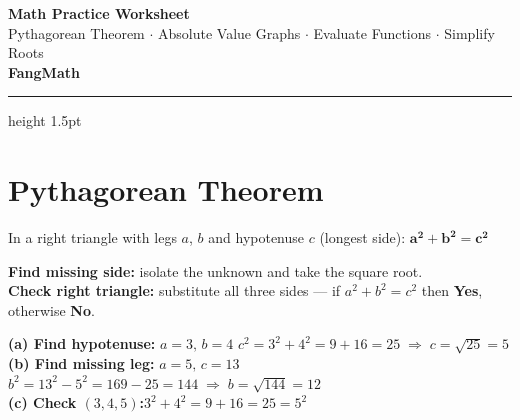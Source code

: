 \documentclass[11pt]{article}
\begin{document}
\begin{center}
{\LARGE\bfseries\color{mainblue}Math Practice Worksheet}\\[4pt]
{\normalsize\color{gray}Pythagorean Theorem $\cdot$ Absolute Value Graphs $\cdot$ Evaluate Functions $\cdot$ Simplify Roots}\\[3pt]
{\small\color{mainorange}\textbf{FangMath}}
\end{center}
\hrule height 1.5pt\vspace{0.8em}

\section{Pythagorean Theorem}

\begin{tcolorbox}[keybox,title={Key Formula}]
In a right triangle with legs $a$, $b$ and hypotenuse $c$ (longest side):\quad
$\boldsymbol{a^2+b^2=c^2}$

\textbf{Find missing side:} isolate the unknown and take the square root.\\
\textbf{Check right triangle:} substitute all three sides --- if $a^2+b^2=c^2$ then \textbf{Yes}, otherwise \textbf{No}.
\end{tcolorbox}

\begin{tcolorbox}[exbox,title={Example}]
\textbf{(a) Find hypotenuse:} $a=3,\,b=4$\qquad
$c^2=3^2+4^2=9+16=25\;\Rightarrow\;c=\sqrt{25}=\boxed{5}$\\[5pt]
\textbf{(b) Find missing leg:} $a=5,\,c=13$\qquad
$b^2=13^2-5^2=169-25=144\;\Rightarrow\;b=\sqrt{144}=\boxed{12}$\\[5pt]
\textbf{(c) Check $(3,4,5)$:}\quad $3^2+4^2=9+16=25=5^2$\;\checkmark\quad{}
\end{tcolorbox}
\end{document}
